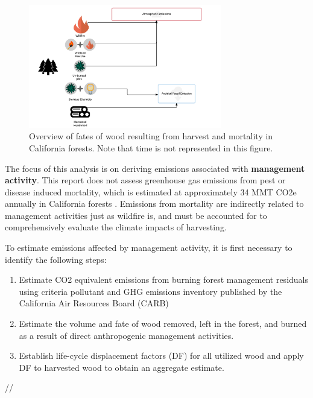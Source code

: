 \documentclass[a4paper]{article}
\begin{document}
\begin{figure}[htb]
\centering
\includegraphics[width=0.75\textwidth]{./graphics/wood_fates.pdf}
\caption{Overview of fates of wood resulting from harvest and mortality in California forests. Note that time is not represented in this figure. \label{fig:wood_fates}}
\end{figure}


The focus of this analysis is on deriving emissions associated with \textbf{management activity}. This report does not assess greenhouse gas emissions from pest or disease induced mortality, which is estimated at approximately 34 MMT CO2e annually in California forests \cite{Christensen2016}. Emissions from mortality are indirectly related to management activities just as wildfire is, and must be accounted for to comprehensively evaluate the climate impacts of harvesting.    

To estimate emissions affected by management activity, it is first necessary to identify the following steps:

\begin{enumerate}
\item Estimate CO2 equivalent emissions from burning forest management
residuals using criteria pollutant and GHG emissions inventory
published by the California Air Resources Board (CARB)

\item Estimate the volume and fate of wood removed, left in the
forest, and burned as a result of direct anthropogenic management
activities.

\item Establish life-cycle displacement factors (DF) for all
utilized wood and apply DF to harvested wood to obtain an aggregate estimate.
\end{enumerate}
//
\end{document}
